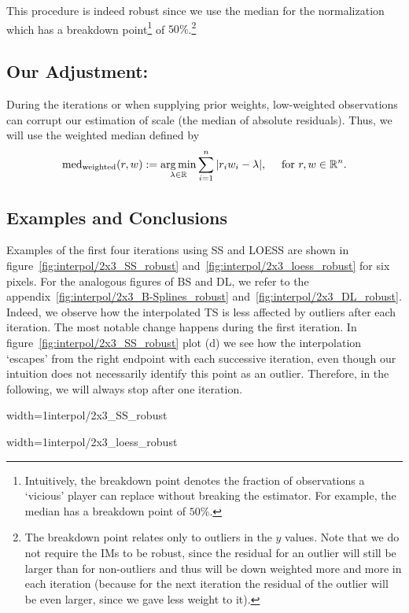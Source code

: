 {{		%
	}
	This procedure is indeed robust since we use the median for the normalization which has a breakdown point\footnote{Intuitively, the breakdown point denotes the fraction of observations a `vicious' player can replace without breaking the estimator. For example, the median has a breakdown point of $50 \%$.} of $50 \%$.\footnote{The breakdown point relates only to outliers in the $y$ values. Note that we do not require the {{IM}}s to be robust, since the residual for an outlier will  still be larger than for non-outliers and thus will be down weighted more and more in each iteration (because for the next iteration the residual of the outlier will be even larger, since we gave less weight to it).}
	\subsection{Our Adjustment:}{
		During the iterations or when supplying prior weights, low-weighted observations can corrupt our estimation of scale (the median of absolute residuals). Thus, we will use the weighted median defined by
		$$
			\operatorname{med}_\text{weighted}(r,w) := \operatorname*{arg\, min}_{\lambda \in \mathbb{R}} \sum_{i=1}^n |r_iw_i -\lambda|,
			\quad\text{ for }r,w\in \mathbb{R}^n.
		$$
		
	}
	\subsection{Examples and Conclusions}{		
		Examples of the first four iterations using SS and LOESS are shown in figure~\ref{fig:interpol/2x3_SS_robust} and~\ref{fig:interpol/2x3_loess_robust} for six pixels. For the analogous figures of BS and DL, we refer to the appendix~\ref{fig:interpol/2x3_B-Splines_robust} and~\ref{fig:interpol/2x3_DL_robust}.
		Indeed, we observe how the interpolated {TS} is less affected by outliers after each iteration. The most notable change happens during the first iteration. In figure~\ref{fig:interpol/2x3_SS_robust} plot (d) we see how the interpolation `escapes' from the right endpoint with each successive iteration, even though our intuition does not necessarily identify this point as an outlier. Therefore, in the following, we will always stop after one iteration.

		\begin{my_figure}[h]{width=1\textwidth}{interpol/2x3_SS_robust}
			\caption[Smoothing splines robustification.]{Smoothing splines \RobItPlot}
			\label{fig:interpol/2x3_SS_robust}
		\end{my_figure}
		\begin{my_figure}[h]{width=1\textwidth}{interpol/2x3_loess_robust}
			\caption[The LOESS smoother robustification.]{The LOESS smoother \RobItPlot}
			\label{fig:interpol/2x3_loess_robust}
		\end{my_figure}
	} 
	
}
